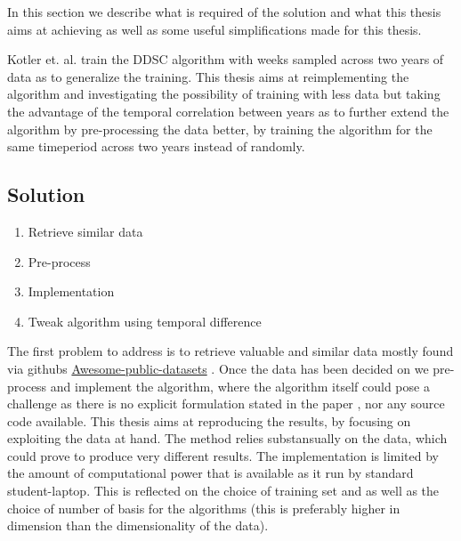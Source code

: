 In this section we describe what is required of the solution and what this thesis aims at achieving as well as some useful simplifications made for this thesis.


Kotler et. al. \cite{DDSC} train the DDSC algorithm with weeks sampled across two years of data as to generalize the training. This thesis aims at reimplementing the algorithm and investigating the possibility of training with less data but taking the advantage of the temporal correlation between years as to further extend the algorithm by pre-processing the data better, by training the algorithm for the same timeperiod across two years instead of randomly.

\subsection{Solution}

\begin{enumerate}
	\item{Retrieve similar data}
	\item{Pre-process}
	\item{Implementation}
	\item{Tweak algorithm using temporal difference}
\end{enumerate}

The first problem to address is to retrieve valuable and similar data mostly found via githubs \href{https://github.com/caesar0301/awesome-public-datasets}{Awesome-public-datasets} \cite{awesome}. Once the data has been decided on we pre-process and implement the algorithm, where the algorithm itself could pose a challenge as there is no explicit formulation stated in the paper \cite{DDSC}, nor any source code available. This thesis aims at reproducing the results, by focusing on exploiting the data at hand. The method relies substansually on the data, which could prove to produce very different results. The implementation is limited by the amount of computational power that is available as it run by standard student-laptop. This is reflected on the choice of training set and as well as the choice of number of basis for the algorithms (this is preferably higher in dimension than the dimensionality of the data).